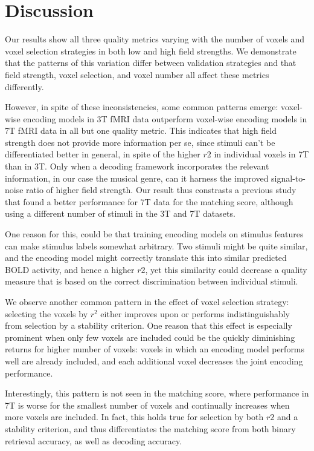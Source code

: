 \section*{Discussion}

Our results show all three quality metrics varying with the number of
voxels and voxel selection strategies in both low and high field strengths.
We demonstrate that the patterns of this variation differ between validation strategies
and that field strength, voxel selection, and voxel number all affect these metrics
differently.

However, in spite of these inconsistencies, some common patterns emerge:
voxel-wise encoding models in 3T f{MRI} data outperform voxel-wise encoding models in
7T f{MRI} data in all but one quality metric.
This indicates that high field strength does not provide more information per
se, since stimuli can't be differentiated better in general, in spite of the higher
$r2$ in individual voxels in 7T than in 3T.
Only when a decoding framework incorporates the relevant information, in our
case the musical genre, can it harness the improved signal-to-noise ratio of
higher field strength.
Our result thus constrasts a  previous study \citep{SF14} that found a better
performance for 7T data for the matching score, although using a different
number of stimuli in the 3T and 7T datasets.

One reason for this, could be that training encoding models on stimulus features
can make stimulus labels somewhat arbitrary.
Two stimuli might be quite similar, and the encoding model might correctly translate this into similar
predicted BOLD activity, and hence a higher $r2$,  yet this similarity could decrease a quality measure
that is based on the correct discrimination between individual stimuli.

We observe another common pattern in the effect of voxel selection strategy:
selecting the voxels by $r^2$ either improves upon or performs indistinguishably
from selection by a stability criterion.
One reason that this effect is especially prominent when only few voxels are included could
be the quickly diminishing returns for higher number of voxels: voxels in which 
an encoding model performs well are already included, and each additional voxel
decreases the joint encoding performance.

Interestingly, this pattern is not seen in the
matching score, where performance in 7T is worse for the smallest number
of voxels and continually increases when more voxels are included.
In fact, this holds true for selection by both $r2$ and a stability criterion,
and thus differentiates the matching score from both binary retrieval accuracy,
as well as decoding accuracy.

